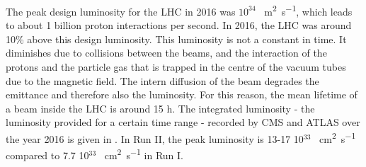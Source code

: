 The peak design luminosity for the LHC in 2016 was $10^{34}$ \si{\per\square\meter \per\second }, which leads to about 1 billion proton interactions per second. In 2016, the LHC was around 10\% above this design luminosity\cite{Harriet:2212301}. This luminosity is not a constant in time. It diminishes due to collisions between the beams, and the interaction of the protons and the particle gas that is trapped in the centre of the vacuum tubes due to the magnetic field. The intern diffusion of the beam degrades the emittance and therefore also the luminosity. For this reason, the mean lifetime of a beam inside the LHC is around 15 \si{ \hour}. The integrated luminosity - the luminosity provided for a certain time range - recorded by CMS and ATLAS over the year 2016 is given in . In Run II, the peak luminosity is 13-17 10$^{33}$ \si{ \per \square \centi \meter \per \second} compared to 7.7 10$^{33}$ \si{ \per \square \centi \meter \per \second} in Run I.
